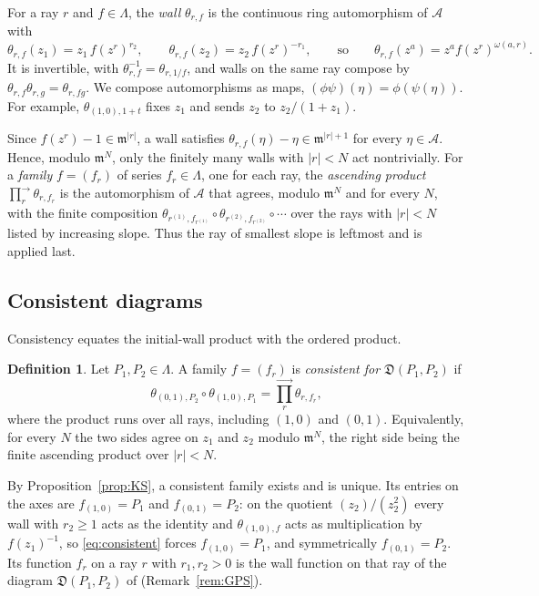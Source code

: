\documentclass[11pt]{article}
\theoremstyle{definition}
\newtheorem{definition}[theorem]{Definition}
\theoremstyle{remark}
\numberwithin{equation}{section}
\newcommand{\m}{\mathfrak{m}}
\newcommand{\asc}{\textstyle\prod^{\rightarrow}}
\begin{document}
For a ray $r$ and $f\in\Lambda$, the \emph{wall} $\theta_{r,f}$ is the
continuous ring automorphism of $\mathcal{A}$ with
\begin{equation}\label{eq:wall}
  \theta_{r,f}(z_1)=z_1\,f(z^r)^{r_2},\qquad
  \theta_{r,f}(z_2)=z_2\,f(z^r)^{-r_1},\qquad\text{so}\qquad
  \theta_{r,f}(z^a)=z^a f(z^r)^{\omega(a,r)} .
\end{equation}
It is invertible, with $\theta_{r,f}^{-1}=\theta_{r,1/f}$, and walls on
the same ray compose by $\theta_{r,f}\theta_{r,g}=\theta_{r,fg}$. We
compose automorphisms as maps, $(\phi\psi)(\eta)=\phi(\psi(\eta))$. For
example, $\theta_{(1,0),1+t}$ fixes $z_1$ and sends $z_2$ to
$z_2/(1+z_1)$.

Since $f(z^r)-1\in\m^{|r|}$, a wall satisfies $\theta_{r,f}(\eta)-\eta\in\m^{|r|+1}$
for every $\eta\in\mathcal{A}$. Hence, modulo $\m^N$, only the finitely many
walls with $|r|<N$ act nontrivially. For a \emph{family}
$f=(f_r)$ of series $f_r\in\Lambda$, one for each ray, the
\emph{ascending product} $\asc_r\theta_{r,f_r}$ is the automorphism of
$\mathcal{A}$ that agrees, modulo $\m^N$ and for every $N$, with the
finite composition $\theta_{r^{(1)},f_{r^{(1)}}}\circ\theta_{r^{(2)},f_{r^{(2)}}}\circ\cdots$
over the rays with $|r|<N$ listed by increasing slope. Thus the ray of
smallest slope is leftmost and is applied last.

\subsection{Consistent diagrams}
Consistency equates the initial-wall product with the ordered product.

\begin{definition}\label{def:consistent}
Let $P_1,P_2\in\Lambda$. A family $f=(f_r)$ is \emph{consistent for
$\mathfrak{D}(P_1,P_2)$} if
\begin{equation}\label{eq:consistent}
  \theta_{(0,1),P_2}\circ\theta_{(1,0),P_1}=\asc_r\theta_{r,f_r},
\end{equation}
where the product runs over all rays, including $(1,0)$ and $(0,1)$.
Equivalently, for every $N$ the two sides agree on $z_1$ and $z_2$ modulo
$\m^N$, the right side being the finite ascending product over $|r|<N$.
\end{definition}

By Proposition~\ref{prop:KS}, a consistent family exists and is unique.
Its entries on the axes are $f_{(1,0)}=P_1$ and $f_{(0,1)}=P_2$: on the
quotient $(z_2)/(z_2^2)$ every wall with $r_2\geq1$ acts as the identity
and $\theta_{(1,0),f}$ acts as multiplication by $f(z_1)^{-1}$, so
\eqref{eq:consistent} forces $f_{(1,0)}=P_1$, and symmetrically
$f_{(0,1)}=P_2$. Its function $f_r$ on a ray $r$ with $r_1,r_2>0$ is the
wall function on that ray of the diagram $\mathfrak{D}(P_1,P_2)$ of
\cite[\S2]{BLMMR} (Remark~\ref{rem:GPS}).
\end{document}
